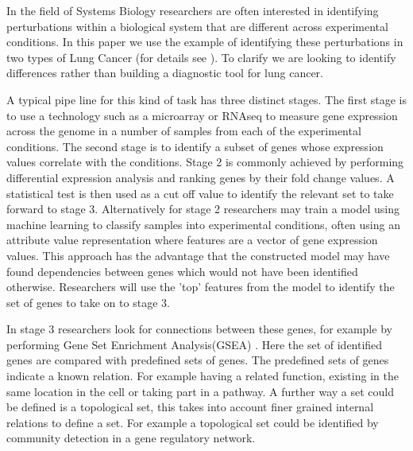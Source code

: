 \documentclass[runningheads,a4paper]{llncs}
\begin{document}
In the field of Systems Biology researchers are often interested in identifying perturbations within a biological system that are different across experimental conditions. In this paper we use the example of identifying these perturbations in two types of Lung Cancer (for details  see \citep{rhrissorrakrai_sbv_2013}).
To clarify we are looking to identify differences rather than building a diagnostic tool for lung cancer.

A typical pipe line for this kind of task has three distinct stages. The first stage is to use a technology such as a microarray or RNAseq to measure gene expression across the genome in a number of samples from each of the experimental conditions. 
The second stage is to identify a subset of genes whose expression values correlate with the conditions.
Stage 2 is commonly achieved by performing differential expression analysis and ranking genes by their fold change values. A statistical test is then used as a cut off value to identify the relevant set to take forward to stage 3. 
Alternatively for stage 2 researchers may train a model using machine learning to classify samples into experimental conditions, often using an attribute value representation where features are a vector of gene expression values. 
This approach has the advantage that the constructed model may have found dependencies between genes which would not have been identified otherwise.
Researchers will use the 'top' features from the model to identify the set of genes to take on to stage 3. 


In stage 3  researchers look for connections between these genes, for example by performing Gene Set Enrichment Analysis(GSEA) \citep{subramanian_gene_2005}. Here the set of identified genes are compared with predefined sets of genes. The predefined sets of genes indicate a known relation. For example having a related function, existing in the same location in the cell or taking part in a pathway. A further way a set could be defined is a topological set, this takes into account finer grained internal relations to define a set. For example a topological set could be identified by community detection in a gene regulatory network.
\end{document}
